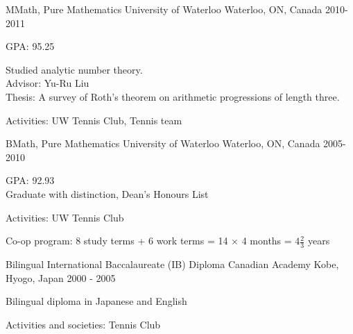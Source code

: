 

\begin{cventries}

  \cventry
    {MMath, Pure Mathematics} %
    {University of Waterloo} %
    {Waterloo, ON, Canada} %
    {2010-2011} %
    {
      \begin{cvitems} %
        \item {GPA: 95.25}
        \item {Studied analytic number theory.\\
          Advisor: Yu-Ru Liu\\
          Thesis: A survey of Roth's theorem on arithmetic progressions of length three.}
        \item {Activities: UW Tennis Club, Tennis team}
      \end{cvitems}
    }

  \cventry
    {BMath, Pure Mathematics} %
    {University of Waterloo} %
    {Waterloo, ON, Canada} %
    {2005-2010} %
    {
      \begin{cvitems} %
        \item {GPA: 92.93\\
          Graduate with distinction, Dean's Honours List}
        \item {Activities: UW Tennis Club}
        \item {Co-op program: 8 study terms + 6 work terms = 14 $\times$ 4 months = $4 \frac{2}{3}$ years}
      \end{cvitems}
    }

  \cventry
    {Bilingual International Baccalaureate (IB) Diploma} %
    {Canadian Academy} %
    {Kobe, Hyogo, Japan} %
    {2000 - 2005} %
    {
      \begin{cvitems} %
        \item {Bilingual diploma in Japanese and English}
        \item {Activities and societies: Tennis Club}
      \end{cvitems}
    }

\end{cventries}

